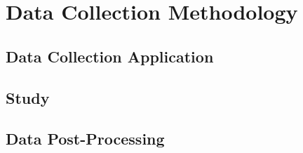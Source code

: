 \section{Data Collection Methodology} %

\subsection{Data Collection Application}

\subsection{Study}

\subsection{Data Post-Processing}


%
